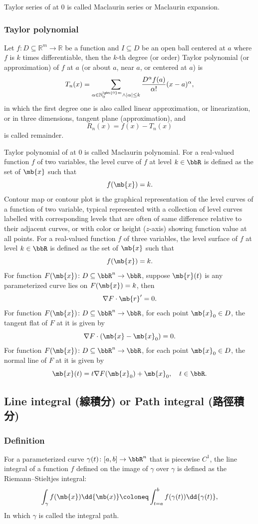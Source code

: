 Taylor series of at $0$ is called Maclaurin series or Maclaurin expansion.
\subsubsection{Taylor polynomial}
Let $f\colon D\subseteq\mathbb{R}^m\to\mathbb{R}$ be a function and $I\subseteq D$ be an open ball centered at $a$ where $f$ is $k$ times differentiable, then the $k$-th degree (or order) Taylor polynomial (or approximation) of $f$ at $a$ (or about $a$, near $a$, or centered at $a$) is
\[T_n(x)=\sum_{\alpha\in\mathbb{N}_0^{\pht{0}m}\land|\alpha|\leq k}\frac{D^{\alpha}f(a)}{\alpha !}(x-a)^{\alpha},\]
in which the first degree one is also called linear approximation, or linearization, or in three dimensions, tangent plane (approximation), and
\[R_n(x)=f(x)-T_n(x)\]
is called remainder.

Taylor polynomial of at $0$ is called Maclaurin polynomial.
For a real-valued function $f$ of two variables, the level curve of $f$ at level $k\in\bbR$ is defined as the set of $\mb{x}$ such that
\[f(\mb{x})=k.\]
Contour map or contour plot is the graphical representation of the level curves of a function of two variable, typical represented with a collection of level curves labelled with corresponding levels that are often of same difference relative to their adjacent curves, or with color or height ($z$-axis) showing function value at all points.
For a real-valued function $f$ of three variables, the level surface of $f$ at level $k\in\bbR$ is defined as the set of $\mb{x}$ such that
\[f(\mb{x})=k.\]
For function $F(\mb{x})\colon D\subseteq\bbR^n\to\bbR$, suppose $\mb{r}(t)$ is any parameterized curve lies on $F(\mb{x})=k$, then
\[\nabla F\cdot\mb{r}'=0.\]
For function $F(\mb{x})\colon D\subseteq\bbR^n\to\bbR$, for each point $\mb{x}_0\in D$, the tangent flat of $F$ at it is given by
\[\nabla F\cdot(\mb{x}-\mb{x}_0)=0.\]
For function $F(\mb{x})\colon D\subseteq\bbR^n\to\bbR$, for each point $\mb{x}_0\in D$, the normal line of $F$ at it is given by
\[\mb{x}(t)=t\nabla F(\mb{x}_0)+\mb{x}_0,\quad t\in\bbR.\]
\subsection{Line integral (線積分) or Path integral (路徑積分)}
\subsubsection{Definition}
For a parameterized curve $\gamma(t)\colon[a,b]\to\bbR^n$ that is piecewise $C^1$, the line integral of a function $f$ defined on the image of $\gamma$ over $\gamma$ is defined as the Riemann–Stieltjes integral:
\[\int_{\gamma}f(\mb{x})\dd{\mb(x)}\coloneq\int_{t=a}^bf(\gamma(t))\dd{\gamma(t)},\]
In which $\gamma$ is called the integral path.

